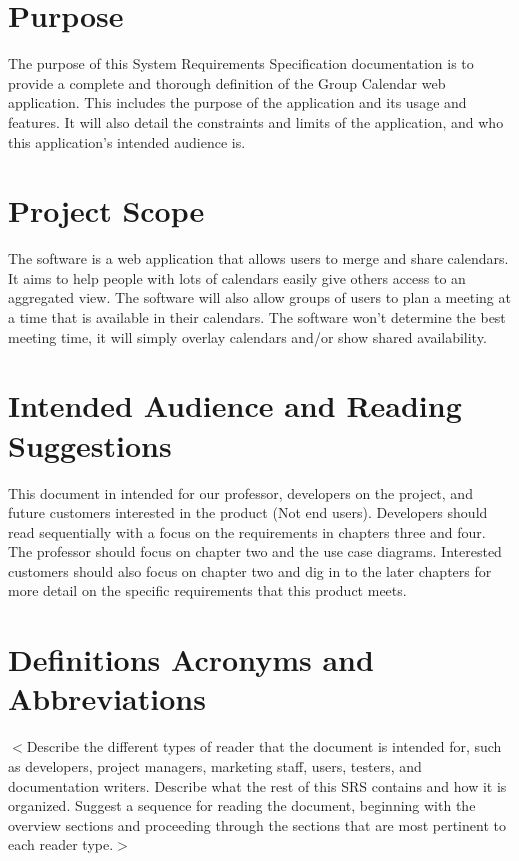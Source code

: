 \documentclass{scrreprt}
\begin{document}
\section{Purpose}

The purpose of this System Requirements Specification documentation is to
provide a complete and thorough definition of the Group Calendar web application.
This includes the purpose of the application and its usage and features. It will
also detail the constraints and limits of the application, and who this
application's intended audience is.


\section{Project Scope}

The software is a web application that allows users to merge and share calendars.
It aims to help people with lots of calendars easily give others access to an
aggregated view. The software will also allow groups of users to plan a meeting
at a time that is available in their calendars. The software won’t determine the
best meeting time, it will simply overlay calendars and/or show shared availability.


\section{Intended Audience and Reading Suggestions}

This document in intended for our professor, developers on the project, and
future customers interested in the product (Not end users). Developers should
read sequentially with a focus on the requirements in chapters three and four.
The professor should focus on chapter two and the use case diagrams. Interested
customers should also focus on chapter two and dig in to the later chapters for
more detail on the specific requirements that this product meets.


\section{Definitions Acronyms and Abbreviations}
$<$Describe the different types of reader that the document is intended for,
such as developers, project managers, marketing staff, users, testers, and
documentation writers. Describe what the rest of this SRS contains and how it is
organized. Suggest a sequence for reading the document, beginning with the
overview sections and proceeding through the sections that are most pertinent to
each reader type.$>$
\end{document}
